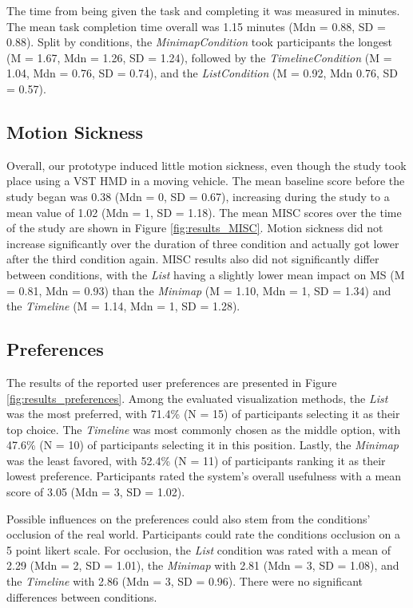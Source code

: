 The time from being given the task and completing it was measured in minutes. The mean task completion time overall was 1.15 minutes (Mdn = 0.88, SD = 0.88). Split by conditions, the \textit{MinimapCondition} took participants the longest (M = 1.67, Mdn = 1.26, SD = 1.24), followed by the \textit{TimelineCondition} (M = 1.04, Mdn = 0.76, SD = 0.74), and the \textit{ListCondition} (M = 0.92, Mdn 0.76, SD = 0.57).


\subsection{Motion Sickness}
Overall, our prototype induced little motion sickness, even though the study took place using a VST HMD in a moving vehicle. The mean baseline score before the study began was 0.38 (Mdn = 0, SD = 0.67), increasing during the study to a mean value of 1.02 (Mdn = 1, SD = 1.18). The mean MISC scores over the time of the study are shown in Figure \ref{fig:results_MISC}. Motion sickness did not increase significantly over the duration of three condition and actually got lower after the third condition again. MISC results also did not significantly differ between conditions, with the \textit{List} having a slightly lower mean impact on MS (M = 0.81, Mdn = 0.93) than the \textit{Minimap} (M = 1.10, Mdn = 1, SD = 1.34) and the \textit{Timeline} (M = 1.14, Mdn = 1, SD = 1.28).



\subsection{Preferences}
\label{sec:results_preferences}
The results of the reported user preferences are presented in Figure \ref{fig:results_preferences}. Among the evaluated visualization methods, the \textit{List} was the most preferred, with 71.4\% (N = 15) of participants selecting it as their top choice. The \textit{Timeline} was most commonly chosen as the middle option, with 47.6\% (N = 10) of participants selecting it in this position. Lastly, the \textit{Minimap} was the least favored, with 52.4\% (N = 11) of participants ranking it as their lowest preference. Participants rated the system's overall usefulness with a mean score of 3.05 (Mdn = 3, SD = 1.02).

Possible influences on the preferences could also stem from the conditions' occlusion of the real world. Participants could rate the conditions occlusion on a 5 point likert scale. For occlusion, the \textit{List} condition was rated with a mean of 2.29 (Mdn = 2, SD = 1.01), the \textit{Minimap} with 2.81 (Mdn = 3, SD = 1.08), and the \textit{Timeline} with 2.86 (Mdn = 3, SD = 0.96). There were no significant differences between conditions.

